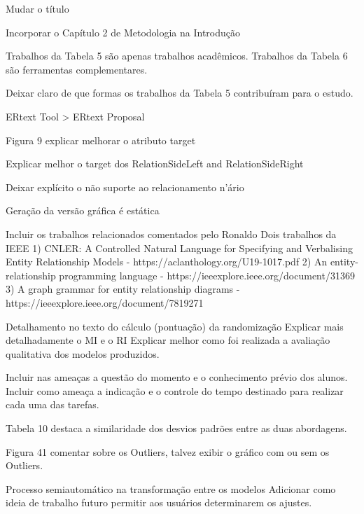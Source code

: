 Mudar o título

Incorporar o Capítulo 2 de Metodologia na Introdução

Trabalhos da Tabela 5 são apenas trabalhos acadêmicos.
Trabalhos da Tabela 6 são ferramentas complementares.

Deixar claro de que formas os trabalhos da Tabela 5 contribuíram para o estudo.

ERtext Tool > ERtext Proposal

Figura 9 explicar melhorar o atributo target

Explicar melhor o target dos RelationSideLeft and RelationSideRight

Deixar explícito o não suporte ao relacionamento n'ário

Geração da versão gráfica é estática

Incluir os trabalhos relacionados comentados pelo Ronaldo
Dois trabalhos da IEEE
1) CNLER: A Controlled Natural Language for Specifying and Verbalising Entity Relationship Models - https://aclanthology.org/U19-1017.pdf
2) An entity-relationship programming language - https://ieeexplore.ieee.org/document/31369
3) A graph grammar for entity relationship diagrams - https://ieeexplore.ieee.org/document/7819271

Detalhamento no texto do cálculo (pontuação) da randomização
Explicar mais detalhadamente o MI e o RI
Explicar melhor como foi realizada a avaliação qualitativa dos modelos produzidos.

Incluir nas ameaças a questão do momento e o conhecimento prévio dos alunos.
Incluir como ameaça a indicação e o controle do tempo destinado para realizar cada uma das tarefas.

Tabela 10 destaca a similaridade dos desvios padrões entre as duas abordagens.

Figura 41 comentar sobre os Outliers, talvez exibir o gráfico com ou sem os Outliers.

Processo semiautomático na transformação entre os modelos
Adicionar como ideia de trabalho futuro permitir aos usuários determinarem os ajustes.
